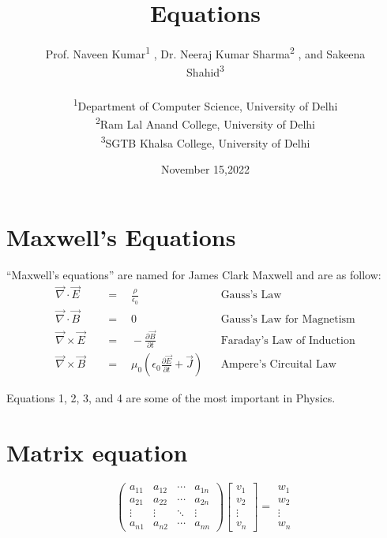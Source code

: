\documentclass[10pt,a4 paper]{article}
\title{Equations}
\author{Prof. Naveen Kumar\textsuperscript{1} , Dr. Neeraj Kumar Sharma\textsuperscript{2} , and Sakeena\\ Shahid\textsuperscript{3}\\\\
\textsuperscript{1}Department of Computer Science, University of Delhi\\
\textsuperscript{2}Ram Lal Anand College, University of Delhi\\
\textsuperscript{3}SGTB Khalsa College, University of Delhi}
\date{November 15,2022}
\begin{document}
\maketitle

\section{Maxwell's Equations}
``Maxwell's equations'' are named for James Clark Maxwell and are as follow:
\begin{align*}
\vec{\nabla} \cdot \vec{E} \quad &= \quad \frac{\rho}{\epsilon_0}  &&\text{Gauss's Law} \tag{1} \\
\vec{\nabla} \cdot \vec{B} \quad &= \quad 0  && \text{Gauss's Law for Magnetism} \tag{2} \\
\vec{\nabla} \times \vec{E} \quad &= \quad -\frac{\partial\vec{B}}{\partial t} && \text{Faraday's Law of Induction} \tag{3} \\
\vec{\nabla} \times \vec{B} \quad &=\quad \mu_0 \left(\epsilon_0 \frac{\partial\vec{E}}{\partial t} + \vec{J}\right)  && \text{Ampere's Circuital Law} \tag{4}
\end{align*} 

Equations 1, 2, 3, and 4 are some of the most important in Physics.

\section{Matrix equation}

\[\begin{pmatrix}
a_{11}&a_{12}&\cdots&a_{1n} \\
a_{21}&a_{22}&\cdots&a_{2n} \\
\vdots&\vdots&\ddots&\vdots \\
a_{n1}&a_{n2}&\cdots&a_{nn}
\end{pmatrix}
\begin{bmatrix}
v_{1} \\
v_{2} \\
\vdots \\
v_{n}
\end{bmatrix} = 
\begin{matrix}
w_{1} \\
w_{2} \\
\vdots \\
w_{n}
\end{matrix}\]


\end{document}
